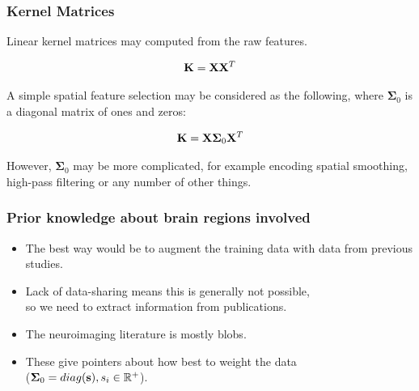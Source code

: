 
\begin{frame}
\frametitle{Kernel Matrices}
Linear kernel matrices may computed from the raw features.
\begin{Large}
\begin{eqnarray*}
{\bf K} = {\bf X}{\bf X}^T
\end{eqnarray*}
\end{Large}
A simple spatial feature selection may be considered as the following, where $\boldsymbol\Sigma_0$ is a diagonal matrix of ones and zeros:
\begin{Large}
\begin{eqnarray*}
{\bf K} = {\bf X}\boldsymbol\Sigma_0{\bf X}^T
\end{eqnarray*}
\end{Large}
However, $\boldsymbol\Sigma_0$ may be more complicated, for example encoding spatial smoothing, high-pass filtering or any number of other things.
\end{frame}

\begin{frame}
\frametitle{Prior knowledge about brain regions involved}
\begin{itemize}
\item The best way would be to augment the training data with data from previous studies.
\item Lack of data-sharing means this is generally not possible,\\
      so we need to extract information from publications.
\item The neuroimaging literature is mostly blobs.
\item These give pointers about how best to weight the data\\
      ($\boldsymbol\Sigma_0 = diag({\bf s}), s_i \in \mathbb{R}^+$).
\end{itemize}
\end{frame}

